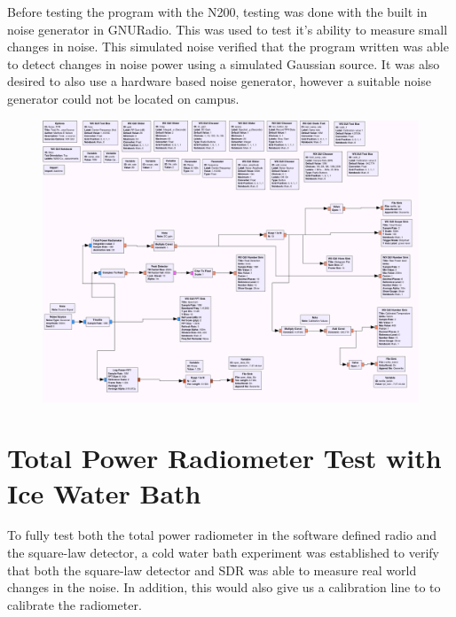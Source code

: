 Before testing the program with the N200, testing was done with the built in noise generator in GNURadio.  This was used to test it's ability to measure small changes in noise.  This simulated noise verified that the program written was able to detect changes in noise power using a simulated Gaussian source.  It was also desired to also use a hardware based noise generator, however a suitable noise generator could not be located on campus.

{\begin{figure}[h!tb] \centering
\includegraphics[width=\textwidth]{Images/noisesrc_radiometer.png}
\label{noise_test}
\end{figure}
}

\section{Total Power Radiometer Test with Ice Water Bath}
To fully test both the total power radiometer in the software defined radio and the square-law detector, a cold water bath experiment was established to verify that both the square-law detector and SDR was able to measure real world changes in the noise.  In addition, this would also give us a calibration line to to calibrate the radiometer.

